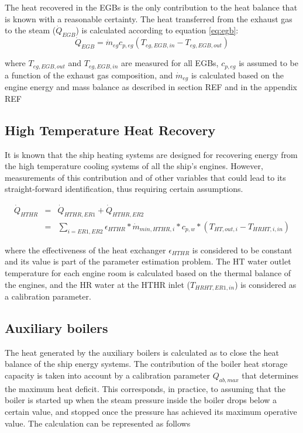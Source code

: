 \documentclass[]{article}
\begin{document}
The heat recovered in the EGBs is the only contribution to the heat balance that is known with a reasonable certainty. The heat transferred from the exhaust gas to the steam ($\dot{Q}_{EGB}$) is calculated according to equation \ref{eq:egb}:
\begin{equation}
\dot{Q}_{EGB} = \dot{m}_{eg} c_{p,eg} (T_{eg,EGB,in} - T_{eg,EGB,out})
\end{equation}\label{eq:egb}

where $T_{eg,EGB,out}$ and $T_{eg,EGB,in}$ are measured for all EGBs, $c_{p,eg}$ is assumed to be a function of the exhaust gas composition, and $ \dot{m}_{eg} $ is calculated based on the engine energy and mass balance as described in section REF and in the appendix REF

\subsection{High Temperature Heat Recovery}

It is known that the ship heating systems are designed for recovering energy from the high temperature cooling systems of all the ship's engines. However, measurements of this contribution and of other variables that could lead to its straight-forward identification, thus requiring certain assumptions. 

\begin{eqnarray}
\dot{Q}_{HTHR} & = & \dot{Q}_{HTHR,ER1} + \dot{Q}_{HTHR,ER2} \\
 & = & \sum_{i=ER1,ER2}{\epsilon_{HTHR} * \dot{m}_{min,HTHR,i} * c_{p,w} * (T_{HT,out,i} - T_{HRHT,i,in})} \label{eqn:HTHR2}
\end{eqnarray}

where the effectiveness of the heat exchanger $\epsilon_{HTHR}$ is considered to be constant and its value is part of the parameter estimation problem. The HT water outlet temperature for each engine room is calculated based on the thermal balance of the engines, and the HR water at the HTHR inlet ($T_{HRHT,ER1,in}$) is considered as a calibration parameter. 

\subsection{Auxiliary boilers}

The heat generated by the auxiliary boilers is calculated as to close the heat balance of the ship energy systems. The contribution of the boiler heat storage capacity is taken into account by a calibration parameter $Q_{ab,max}$ that determines the maximum heat deficit. This corresponds, in practice, to assuming that the boiler is started up when the steam pressure inside the boiler drops below a certain value, and stopped once the pressure has achieved its maximum operative value. The calculation can be represented as follows
\end{document}
